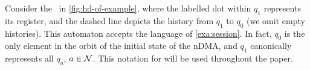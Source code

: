 \begin{example}
Consider the \hdma\ in \autoref{fig:hd-of-example},
%
where the labelled dot within $q_1$ represents its register, and the dashed line depicts the history from $q_1$ to $q_0$ (we omit empty histories). This automaton accepts the language of \cref{exa:session}. In fact, $q_0$ is the only element in the orbit of the initial state of the nDMA, and $q_1$ canonically represents all $q_a$, $a \in \mathcal{N}$. This notation for \hdmas{} will be used throughout the paper.
\end{example}

%	
%


% 
